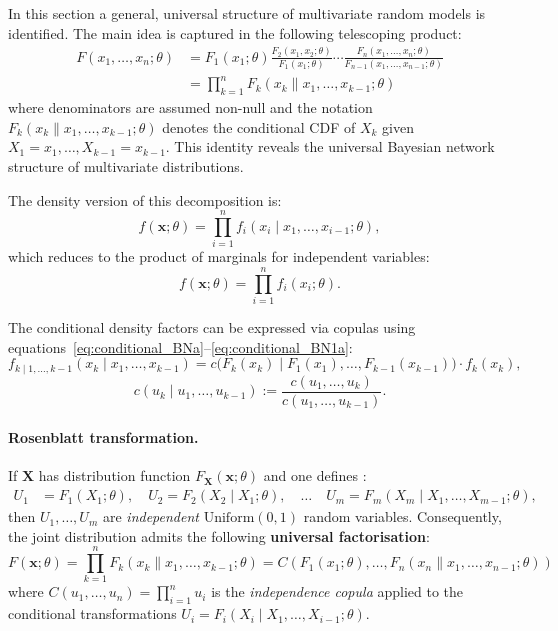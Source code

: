 In this section a general, universal structure of multivariate random models
is identified. The main idea is captured in the following telescoping product:
\begin{align}
F(x_1,\ldots,x_n;\theta)
&= F_1(x_1;\theta)
   \frac{F_2(x_1,x_2;\theta)}{F_1(x_1;\theta)}
   \cdots
   \frac{F_n(x_1,\ldots,x_n;\theta)}{F_{n-1}(x_1,\ldots,x_{n-1};\theta)}
   \nonumber\\
&= \prod_{k=1}^n F_k(x_k \| x_1,\ldots,x_{k-1};\theta)
\label{eq:factorization}
\end{align}
where denominators are assumed non-null and the notation
$F_k(x_k\|x_1,\ldots,x_{k-1};\theta)$ denotes the conditional CDF of $X_k$
given $X_1=x_1,\ldots,X_{k-1}=x_{k-1}$. This identity reveals the universal
Bayesian network structure of multivariate distributions.

The density version of this decomposition is:
\begin{equation}
f(\mathbf{x};\theta) = \prod_{i=1}^n f_i(x_i\mid x_1,\ldots,x_{i-1};\theta),
\label{eq:densityfactorization}
\end{equation}
which reduces to the product of marginals for independent variables:
\begin{equation}
f(\mathbf{x};\theta) = \prod_{i=1}^n f_i(x_i;\theta).
\label{eq:independentfactorization}
\end{equation}

The conditional density factors can be expressed via copulas using
equations~\eqref{eq:conditional_BNa}--\eqref{eq:conditional_BN1a}:
\begin{equation}\label{eq:conditional_BNa}
f_{k\mid 1,\ldots,k-1}(x_k\mid x_{1},\ldots,x_{k-1})
= c\bigl(F_k(x_k)\mid F_1(x_1),\ldots,F_{k-1}(x_{k-1})\bigr)\cdot f_k(x_k),
\end{equation}
\begin{equation}\label{eq:conditional_BN1a}
c(u_k\mid u_{1},\ldots,u_{k-1})
:=\frac{c(u_1,\ldots,u_k)}{c(u_{1},\ldots,u_{k-1})}.
\end{equation}

\paragraph{Rosenblatt transformation.}
If $\mathbf{X}$ has distribution function $F_{\mathbf{X}}(\mathbf{x};\theta)$
and one defines \cite{Rosenblatt1952,ArnoldCS:06}:
\begin{align}\label{Rosenb8}
U_1 &= F_1(X_1;\theta),\quad
U_2 = F_2(X_2\mid X_1;\theta),\quad\ldots\quad
U_m = F_m(X_m\mid X_1,\ldots,X_{m-1};\theta),
\end{align}
then $U_1,\ldots,U_m$ are \emph{independent} $\mathrm{Uniform}(0,1)$ random
variables. Consequently, the joint distribution admits the following
\textbf{universal factorisation}:
\begin{equation}
\boxed{
F(\mathbf{x};\theta)
= \prod_{k=1}^n F_k(x_k\|x_1,\ldots,x_{k-1};\theta)
= C\!\left(F_1(x_1;\theta),\ldots,F_n(x_n\|x_1,\ldots,x_{n-1};\theta)\right)
}
\label{eq:universalfactorization}
\end{equation}
where $C(u_1,\ldots,u_n)=\prod_{i=1}^n u_i$ is the \emph{independence copula}
applied to the conditional transformations $U_i=F_i(X_i\mid X_1,\ldots,X_{i-1};\theta)$.

